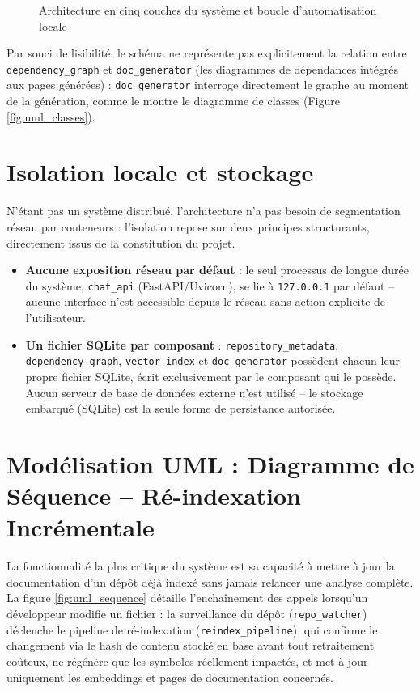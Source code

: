 \documentclass[12pt,a4paper]{report}
\begin{document}
\begin{figure}[H]
{\begin{tikzpicture}
\end{tikzpicture}%
}%
\caption{Architecture en cinq couches du système et boucle d'automatisation locale}
\label{fig:architecture}
\end{figure}

Par souci de lisibilité, le schéma ne représente pas explicitement la relation entre
\texttt{dependency\_graph} et \texttt{doc\_generator} (les diagrammes de dépendances
intégrés aux pages générées) : \texttt{doc\_generator} interroge directement le graphe
au moment de la génération, comme le montre le diagramme de classes (Figure
\ref{fig:uml_classes}).

\section{Isolation locale et stockage}
N'étant pas un système distribué, l'architecture n'a pas besoin de segmentation
réseau par conteneurs : l'isolation repose sur deux principes structurants,
directement issus de la constitution du projet.

\begin{itemize}
    \item \textbf{Aucune exposition réseau par défaut} : le seul processus de longue
    durée du système, \texttt{chat\_api} (FastAPI/Uvicorn), se lie à
    \texttt{127.0.0.1} par défaut -- aucune interface n'est accessible depuis le
    réseau sans action explicite de l'utilisateur.
    \item \textbf{Un fichier SQLite par composant} : \texttt{repository\_metadata},
    \texttt{dependency\_graph}, \texttt{vector\_index} et \texttt{doc\_generator}
    possèdent chacun leur propre fichier SQLite, écrit exclusivement par le
    composant qui le possède. Aucun serveur de base de données externe n'est
    utilisé -- le stockage embarqué (SQLite) est la seule forme de persistance
    autorisée.
\end{itemize}

\section{Modélisation UML : Diagramme de Séquence -- Ré-indexation Incrémentale}
La fonctionnalité la plus critique du système est sa capacité à mettre à jour la
documentation d'un dépôt déjà indexé sans jamais relancer une analyse complète. La
figure \ref{fig:uml_sequence} détaille l'enchaînement des appels lorsqu'un
développeur modifie un fichier : la surveillance du dépôt (\texttt{repo\_watcher})
déclenche le pipeline de ré-indexation (\texttt{reindex\_pipeline}), qui confirme le
changement via le hash de contenu stocké en base avant tout retraitement coûteux, ne
régénère que les symboles réellement impactés, et met à jour uniquement les
embeddings et pages de documentation concernés.
\end{document}
